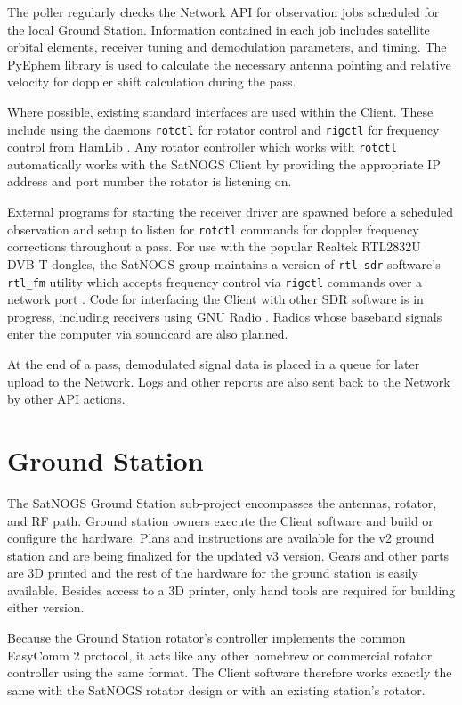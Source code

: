 \documentclass[conference,letterpaper,12pt]{IEEEtran}
\begin{document}
The poller regularly checks the Network API for observation jobs scheduled for the local Ground Station.
Information contained in each job includes satellite orbital elements, receiver tuning and demodulation parameters, and timing.
The PyEphem \cite{PyEphem} library is used to calculate the necessary antenna pointing and relative velocity for doppler shift calculation during the pass.

Where possible, existing standard interfaces are used within the Client.
These include using the daemons \verb|rotctl| for rotator control and \verb|rigctl| for frequency control from HamLib \cite{Hamlib}.
Any rotator controller which works with \verb|rotctl| automatically works with the SatNOGS Client by providing the appropriate IP address and port number the rotator is listening on.

External programs for starting the receiver driver are spawned before a scheduled observation and setup to listen for \verb|rotctl| commands for doppler frequency corrections throughout a pass.
For use with the popular Realtek RTL2832U DVB-T dongles, the SatNOGS group maintains a version of \verb|rtl-sdr| \cite{rtl-sdr} software's \verb|rtl_fm| utility which accepts frequency control via \verb|rigctl| commands over a network port \cite{SatNOGS-rtlsdr}.
Code for interfacing the Client with other SDR software is in progress, including receivers using GNU Radio \cite{GNURadio}.
Radios whose baseband signals enter the computer via soundcard are also planned.

At the end of a pass, demodulated signal data is placed in a queue for later upload to the Network.
Logs and other reports are also sent back to the Network by other API actions.


\section{Ground Station}
The SatNOGS Ground Station sub-project encompasses the antennas, rotator, and RF path.
Ground station owners execute the Client software and build or configure the hardware.
Plans and instructions are available for the v2 ground station and are being finalized for the updated v3 version.
Gears and other parts are 3D printed and the rest of the hardware for the ground station is easily available.
Besides access to a 3D printer, only hand tools are required for building either version.

Because the Ground Station rotator's controller implements the common EasyComm 2 protocol, it acts like any other homebrew or commercial rotator controller using the same format.
The Client software therefore works exactly the same with the SatNOGS rotator design or with an existing station's rotator.
\end{document}

